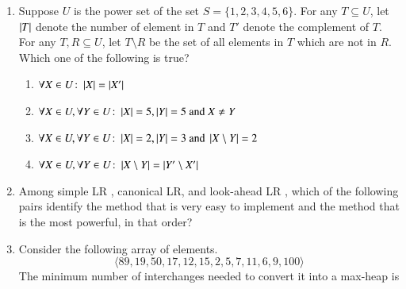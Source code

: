 \documentclass[journal,12pt,onecolumn]{IEEEtran}
\theoremstyle{remark}
\begin{document}
\begin{enumerate}
				\item Suppose $U$ is the power set of the set $S = \{1,2,3,4,5,6\}$. For any $T \subseteq U$, let $\left\vert T\right\vert$ denote the number of element in $T$ and $T'$ denote the complement of $T$. For any $T,R \subseteq U$, let $T \setminus R$ be the set of all elements in $T$ which are not in $R$. Which one of the following is true?
				
				\hfill{}
				
				\begin{enumerate}
					\item $\forall X \in U \colon \left\vert X\right\vert = \left\vert X'\right\vert$
					\item $\forall X \in U, \forall Y \in U \colon \left\vert X\right\vert = 5, \left\vert Y\right\vert = 5 \text{ and } X \neq Y$
					\item $\forall X \in U, \forall Y \in U \colon \left\vert X\right\vert = 2, \left\vert Y\right\vert = 3 \text{ and } \left\vert X \setminus Y\right\vert = 2$
					\item $\forall X \in U, \forall Y \in U \colon \left\vert X \setminus Y\right\vert = \left\vert Y' \setminus X'\right\vert$
				\end{enumerate}
				
				\item Among simple LR , canonical LR, and look-ahead LR , which of the following pairs identify the method that is very easy to implement and the method that is the most powerful, in that order?
				
				\hfill{}
				
				\begin{enumerate}
				\end{enumerate}
				
				\item Consider the following array of elements.
				$$\langle 89,19,50,17,12,15,2,5,7,11,6,9,100 \rangle$$
				The minimum number of interchanges needed to convert it into a max-heap is
				
				\hfill{\brak{\text{GATE CS 2015}}}
				
				\begin{enumerate}
					\begin{multicols}{4}
						\item $4$
						\item $5$
						\item $2$
						\item $3$
					\end{multicols}
				\end{enumerate}
				

\end{enumerate}
\end{document}
